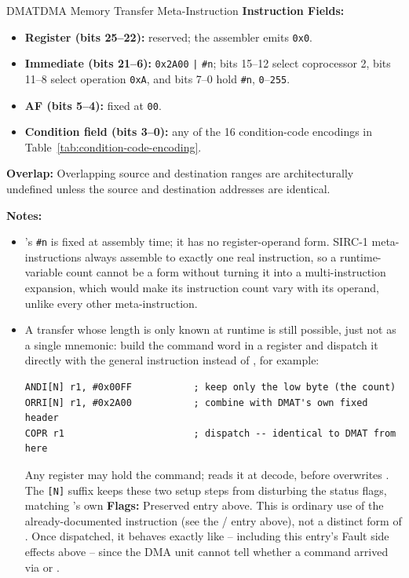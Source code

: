 \begin{instructionbox}{DMAT}{DMA Memory Transfer Meta-Instruction}
	\textbf{Instruction Fields:}
	\begin{itemize}
		\item \textbf{Register (bits 25--22):} reserved; the assembler emits \texttt{0x0}.
		\item \textbf{Immediate (bits 21--6):} \texttt{0x2A00} \texttt{|} \texttt{\#n}; bits 15--12 select coprocessor
		      2, bits 11--8 select operation \texttt{0xA}, and bits 7--0 hold \texttt{\#n}, \texttt{0}--\texttt{255}.
		\item \textbf{AF (bits 5--4):} fixed at \texttt{00}.
		\item \textbf{Condition field (bits 3--0):} any of the 16 condition-code encodings in
		      Table~\ref{tab:condition-code-encoding}.
	\end{itemize}

	\textbf{Overlap:} Overlapping source and destination ranges are architecturally undefined unless the source and
	destination addresses are identical.

	\textbf{Notes:}
	\begin{itemize}
		\item {}'s \texttt{\#n} is fixed at assembly time; it has no register-operand form. SIRC-1
		      meta-instructions always assemble to exactly one real instruction, so a runtime-variable count
		      cannot be a  form without turning it into a multi-instruction expansion, which would
		      make its instruction count vary with its operand, unlike every other meta-instruction.
		\item A transfer whose length is only known at runtime is still possible, just not as a single mnemonic: build the command
		      word in a register and dispatch it directly with the general  instruction instead of ,
		      for example:
		      \begin{lstlisting}
ANDI[N] r1, #0x00FF           ; keep only the low byte (the count)
ORRI[N] r1, #0x2A00           ; combine with DMAT's own fixed header
COPR r1                       ; dispatch -- identical to DMAT from here
		      \end{lstlisting}
		      Any register may hold the command;  reads it at decode, before  overwrites . The
		      \texttt{[N]} suffix keeps these two setup steps from disturbing the status flags, matching 's own
		      \textbf{Flags:} Preserved entry above. This is ordinary use of the already-documented  instruction (see
		      the / entry above), not a distinct form of . Once dispatched, it behaves
		      exactly like  -- including this entry's Fault side effects above -- since the DMA unit cannot tell
		      whether a command arrived via  or .
	\end{itemize}


\end{instructionbox}
